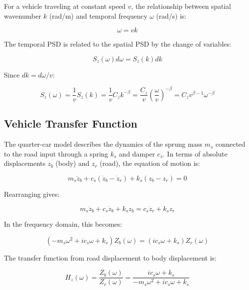 \documentclass[11pt,letterpaper]{article}
\begin{document}
For a vehicle traveling at constant speed $v$, the relationship between spatial wavenumber $k$ (rad/m) and temporal frequency $\omega$ (rad/s) is:

\begin{equation}
\omega = vk
\end{equation}

The temporal PSD is related to the spatial PSD by the change of variables:

\begin{equation}
S_z(\omega) d\omega = S_z(k) dk
\end{equation}

Since $dk = d\omega/v$:

\begin{equation}
S_z(\omega) = \frac{1}{v} S_z(k) = \frac{1}{v} C_z k^{-\beta} = \frac{C_z}{v} \left(\frac{\omega}{v}\right)^{-\beta} = C_z v^{\beta-1} \omega^{-\beta}
\end{equation}


\subsection{Vehicle Transfer Function}

The quarter-car model describes the dynamics of the sprung mass $m_s$ connected to the road input through a spring $k_s$ and damper $c_s$. In terms of absolute displacements $z_b$ (body) and $z_r$ (road), the equation of motion is:

$$m_s \ddot{z}_b + c_s(\dot{z}_b - \dot{z}_r) + k_s(z_b - z_r) = 0$$

Rearranging gives:

\begin{equation}
m_s \ddot{z}_b + c_s \dot{z}_b + k_s z_b = c_s \dot{z}_r + k_s z_r
\end{equation}

In the frequency domain, this becomes:

\begin{equation}
(-m_s \omega^2 + i c_s \omega + k_s) Z_b(\omega) = (i c_s \omega + k_s) Z_r(\omega)
\end{equation}

The transfer function from road displacement to body displacement is:

\begin{equation}
H_z(\omega) = \frac{Z_b(\omega)}{Z_r(\omega)} = \frac{i c_s \omega + k_s}{-m_s \omega^2 + i c_s \omega + k_s}
\end{equation}
\end{document}
